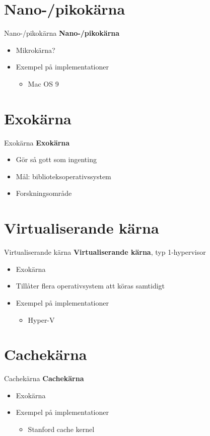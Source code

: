 \documentclass[compress, final]{beamer}
\begin{document}
\section{Nano-/pikokärna}

\begin{frame}{Nano-/pikokärna}
  \textbf{Nano-/pikokärna}
  \begin{itemize}
    \item Mikrokärna?
    \item Exempel på implementationer
    \begin{itemize}
      \item Mac OS 9
    \end{itemize}
  \end{itemize}
\end{frame}


\section{Exokärna}

\begin{frame}{Exokärna}
  \textbf{Exokärna}
  \begin{itemize}
    \item Gör så gott som ingenting
    \item Mål: biblioteksoperativssystem
    \item Forskningsområde
  \end{itemize}
\end{frame}


\section{Virtualiserande kärna}

\begin{frame}{Virtualiserande kärna}
  \textbf{Virtualiserande kärna}, typ 1-hypervisor
  \begin{itemize}
    \item Exokärna
    \item Tillåter flera operativsystem att köras samtidigt
    \item Exempel på implementationer
    \begin{itemize}
      \item Hyper-V
    \end{itemize}
  \end{itemize}
\end{frame}


\section{Cachekärna}

\begin{frame}{Cachekärna}
  \textbf{Cachekärna}
  \begin{itemize}
    \item Exokärna
    \item Exempel på implementationer
    \begin{itemize}
      \item Stanford cache kernel
    \end{itemize}
  \end{itemize}
\end{frame}
\end{document}

